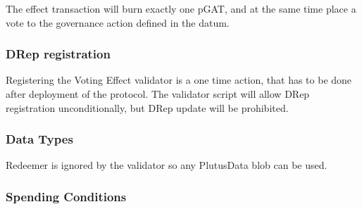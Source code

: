 \documentclass{article}
\begin{document}
The effect transaction will burn exactly one pGAT, and at the same time place a vote to the governance action defined in the datum.

\subsubsection*{DRep registration}

Registering the Voting Effect validator is a one time action, that has to be done after deployment of the protocol.
The validator script will allow DRep registration unconditionally, but DRep update will be prohibited.

\subsubsection*{Data Types}

Redeemer is ignored by the validator so any PlutusData blob can be used.

\subsubsection*{Spending Conditions}
\end{document}
